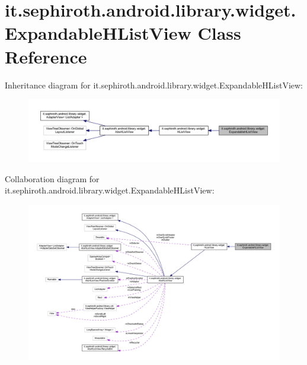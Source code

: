 \hypertarget{classit_1_1sephiroth_1_1android_1_1library_1_1widget_1_1_expandable_h_list_view}{}\section{it.\+sephiroth.\+android.\+library.\+widget.\+Expandable\+H\+List\+View Class Reference}
\label{classit_1_1sephiroth_1_1android_1_1library_1_1widget_1_1_expandable_h_list_view}


Inheritance diagram for it.\+sephiroth.\+android.\+library.\+widget.\+Expandable\+H\+List\+View\+:
\nopagebreak
\begin{figure}[H]
\begin{center}
\leavevmode
\includegraphics[width=350pt]{classit_1_1sephiroth_1_1android_1_1library_1_1widget_1_1_expandable_h_list_view__inherit__graph}
\end{center}
\end{figure}


Collaboration diagram for it.\+sephiroth.\+android.\+library.\+widget.\+Expandable\+H\+List\+View\+:
\nopagebreak
\begin{figure}[H]
\begin{center}
\leavevmode
\includegraphics[width=350pt]{classit_1_1sephiroth_1_1android_1_1library_1_1widget_1_1_expandable_h_list_view__coll__graph}
\end{center}
\end{figure}
